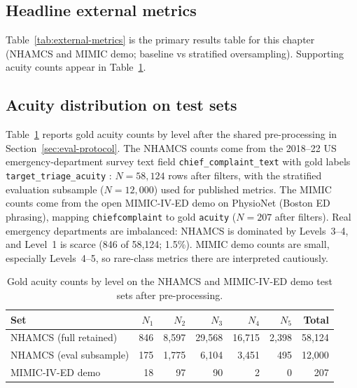 \subsection{Headline external metrics}
\label{sec:nhamcs-results}

Table~\ref{tab:external-metrics} is the primary results table for this chapter (NHAMCS and MIMIC demo; baseline vs stratified oversampling). Supporting acuity counts appear in Table~\ref{tab:external-support}.

\subsection{Acuity distribution on test sets}
\label{sec:external-support}

Table~\ref{tab:external-support} reports gold acuity counts by level after the shared pre-processing in Section~\ref{sec:eval-protocol}. The NHAMCS counts come from the 2018--22 US emergency-department survey text field \texttt{chief\_complaint\_text} with gold labels \texttt{target\_triage\_acuity} \citep{nhamcs201822}: \(N=58{,}124\) rows after filters, with the stratified evaluation subsample (\(N=12{,}000\)) used for published metrics. The MIMIC counts come from the open MIMIC-IV-ED demo on PhysioNet (Boston ED phrasing), mapping \texttt{chiefcomplaint} to gold \texttt{acuity} \citep{mimiciveddemo2023} (\(N=207\) after filters). Real emergency departments are imbalanced: NHAMCS is dominated by Levels~3--4, and Level~1 is scarce (846 of 58{,}124; 1.5\%). MIMIC demo counts are small, especially Levels~4--5, so rare-class metrics there are interpreted cautiously.

\begin{table}[H]
\centering
\small
\begin{tabular}{|l|r|r|r|r|r|r|}
\hline
\textbf{Set} & \(N_1\) & \(N_2\) & \(N_3\) & \(N_4\) & \(N_5\) & \textbf{Total} \\
\hline
NHAMCS (full retained) & 846 & 8{,}597 & 29{,}568 & 16{,}715 & 2{,}398 & 58{,}124 \\
NHAMCS (eval subsample) & 175 & 1{,}775 & 6{,}104 & 3{,}451 & 495 & 12{,}000 \\
MIMIC-IV-ED demo & 18 & 97 & 90 & 2 & 0 & 207 \\
\hline
\end{tabular}
\caption{Gold acuity counts by level on the NHAMCS and MIMIC-IV-ED demo test sets after pre-processing.}
\label{tab:external-support}
\end{table}

